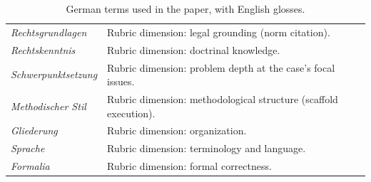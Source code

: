 \begin{table}[t]
\begin{tabular}{@{}p{}p{}@{}}
\emph{Rechtsgrundlagen} & Rubric dimension: legal grounding (norm citation). \\
\emph{Rechtskenntnis} & Rubric dimension: doctrinal knowledge. \\
\emph{Schwerpunktsetzung} & Rubric dimension: problem depth at the case's focal issues. \\
\emph{Methodischer Stil} & Rubric dimension: methodological structure (scaffold execution). \\
\emph{Gliederung} & Rubric dimension: organization. \\
\emph{Sprache} & Rubric dimension: terminology and language. \\
\emph{Formalia} & Rubric dimension: formal correctness. \\
\bottomrule
\end{tabular}
\caption{German terms used in the paper, with English glosses.}
\label{tbl-glossary}
\end{table}

